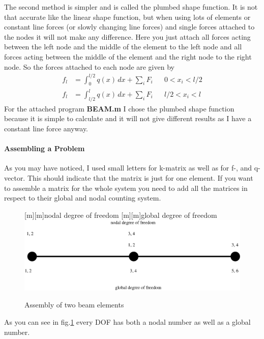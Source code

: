 The second method is simpler and is called the plumbed shape function. It is not that accurate like the linear shape function, but when using lots of elements or constant line forces (or slowly changing line forces) and single forces attached to the nodes it will not make any difference. Here you just attach all forces acting between the left node and the middle of the element to the left node and all forces acting between the middle of the element and the right node to the right node. So the forces attached to each node are given by
\begin{align}
f_l&=\int_0^{l/2}q(x)\,dx+\sum_iF_i &&0<x_i<l/2 \nonumber \\
f_l&=\int_{l/2}^{l}q(x)\,dx+\sum_iF_i &&l/2<x_i<l \nonumber
\end{align}
For the attached program \textbf{BEAM.m} I chose the plumbed shape function because it is simple to calculate and it will not give different results as I have a constant line force anyway.
\bigskip

\paragraph{Assembling a Problem} As you may have noticed, I used small letters for k-matrix as well as for f-, and q-vector. This should indicate that the matrix is just for one element. If you want to assemble a matrix for the whole system you need to add all the matrices in respect to their global and nodal counting system.
\bigskip 

\begin{figure}[!h]
\begin{center}
[m][m]{nodal degree of freedom}
[m][m]{global degree of freedom}
\includegraphics[scale=0.6]{figs/assembly} 
\caption{Assembly of two beam elements}
\label{assembly}
\end{center}
\end{figure}

As you can see in fig.\ref{assembly} every DOF has both a nodal number as well as a global number. 
